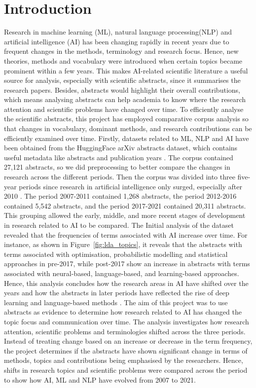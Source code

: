 \documentclass[11pt]{article}
\begin{document}
\section{Introduction}
Research in machine learning (ML), natural language processing(NLP) and artificial intelligence (AI) has been changing rapidly in recent years due to frequent changes in the methods, terminology and research focus. Hence, new theories, methods and vocabulary were introduced when certain topics became prominent within a few years.
This makes AI-related scientific literature a useful source for analysis, especially with scientific abstracts, since it summarises the research papers. Besides, abstracts would highlight their overall contributions, which means analysing abstracts can help academia to know where the research attention and scientific problems have changed over time.
To efficiently analyse the scientific abstracts, this project has employed comparative corpus analysis so that changes in vocabulary, dominant methods, and research contributions can be efficiently examined over time. Firstly, datasets related to ML, NLP and AI have been obtained from the HuggingFace arXiv abstracts dataset, which contains useful metadata like abstracts and publication years \cite{huggingfaceGfissorearxivabstracts2021Datasets}.
The corpus contained 27{,}121 abstracts, so we did preprocessing to better compare the changes in research across the different periods. Then the corpus was divided into three five-year periods since research in artificial intelligence only surged, especially after 2010 \cite{cao2026decreasing}.
The period 2007-2011 contained 1{,}268 abstracts, the period 2012-2016 contained 5{,}542 abstracts, and the period 2017-2021 contained 20{,}311 abstracts. This grouping allowed the early, middle, and more recent stages of development in research related to AI to be compared.
The Initial analysis of the dataset revealed that the frequencies of terms associated with AI increase over time. For instance, as shown in Figure~\ref{fig:lda_topics}, it reveals that the abstracts with terms associated with optimisation, probabilistic modelling and statistical approaches in pre-2017, while post-2017 show an increase in abstracts with terms associated with neural-based, language-based, and learning-based approaches. Hence, this analysis concludes how the research areas in AI have shifted over the years and how the abstracts in later periods have reflected the rise of deep learning and language-based methods \cite{feng2024evolution}.
The aim of this project was to use abstracts as evidence to determine how research related to AI has changed the topic focus and communication over time. The analysis investigates how research attention, scientific problems and terminologies shifted across the three periods. Instead of treating change based on an increase or decrease in the term frequency, the project determines if the abstracts have shown significant change in terms of methods, topics and contributions being emphasised by the researchers. Hence, shifts in research topics and scientific problems were compared across the period to show how AI, ML and NLP have evolved from 2007 to 2021.
\end{document}
